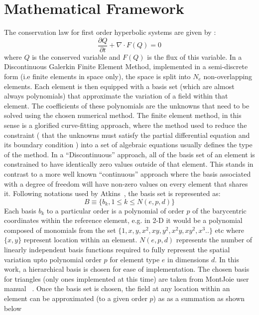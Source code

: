 \documentclass[11pt]{article}
\begin{document}
\section{Mathematical Framework}
The conservation law for first order hyperbolic systems are given by :
\begin{equation}
  \frac{\partial Q}{\partial t} + \nabla \cdot F(Q) = 0
  \label{eq1}
\end{equation}
where $Q$ is the conserved variable and $F(Q)$ is the flux of this variable. In a
Discontinuous Galerkin Finite Element Method, implemented in a semi-discrete form (i.e finite elements in space
only), the space is split into $N_e$ non-overlapping elements.
Each element is then equipped with a basis set (which are almost always polynomials) that
approximate the variation of a field within that element. The coefficients of these polynomials are the
unknowns that need to be solved using the chosen numerical method. The finite element method, in this sense
is a glorified curve-fitting approach, where the method used to reduce the constraint ( that the unknowns
must satisfy the partial differential equation and its boundary condition ) into a set of algebraic equations
usually defines the type of the method. In a ``Discontinuous'' approach, all of the basis set of an element is
constrained to have identically zero values outside of that element. This stands in contrast to a
more well known ``continuous'' approach where the basis associated with a degree of freedom will have
non-zero values on every element that shares it. Following notations used by
Atkins~\cite{atkins}, the basis set is represented as:
\begin{equation}
  B \equiv \{b_k, 1 \leq k \leq N(e,p,d)\}
\end{equation}
Each basis $b_k$ to a particular order is a polynomial of order $p$ of the barycentric
coordinates within the reference element, e.g. in 2-D it would be a polynomial composed of
monomials from the set $\{1,x,y,x^2,xy,y^2,x^2y,xy^2,x^3..\}$ etc where $\{x,y\}$ represent
location within an element. $N(e,p,d)$ represents
the number of linearly independent basis functions required to fully represent the spatial variation
upto polynomial order $p$ for element type $e$ in dimensions $d$.  In this work, a
hierarchical basis is chosen for ease of implementation. The chosen basis for
triangles (only ones implemented at this time) are taken from MontJoie user manual
~\cite{montjoie}. Once the basis set is chosen, the field at any location within an
element can be approximated (to a given order $p$) as  as a summation as shown below
\end{document}
